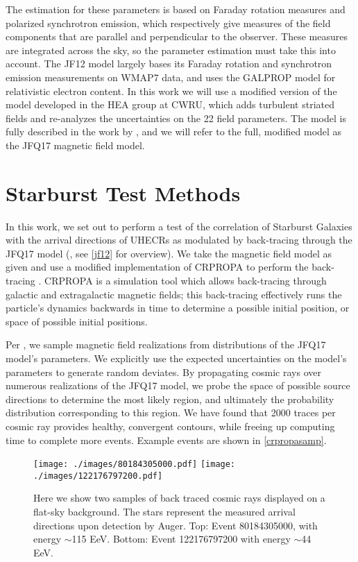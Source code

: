 The estimation for these parameters is based on Faraday rotation measures and polarized synchrotron emission, which respectively give measures of the field components that are parallel and perpendicular to the observer. These measures are integrated across the sky, so the parameter estimation must take this into account. The JF12 model largely bases its Faraday rotation and synchrotron emission measurements on WMAP7 data, and uses the GALPROP model for relativistic electron content. In this work we will use a modified version of the model developed in the HEA group at CWRU, which adds turbulent striated fields and re-analyzes the uncertainties on the 22 field parameters. The model is fully described in the work by , and we will refer to the full, modified model as the JFQ17 magnetic field model.


\section{Starburst Test Methods}%
\label{stest}
In this work, we set out to perform a test of the correlation of Starburst Galaxies with the arrival directions of UHECRs as modulated by back-tracing through the JFQ17 model (\cite{jf12,sean}, see \autoref{jf12} for overview). We take the magnetic field model as given and use a modified implementation of CRPROPA to perform the back-tracing \cite{crpropa}. CRPROPA is a simulation tool which allows back-tracing through galactic and extragalactic magnetic fields; this back-tracing effectively runs the particle's dynamics backwards in time to determine a possible initial position, or space of possible initial positions. 

Per , we sample magnetic field realizations from distributions of the JFQ17 model's parameters. We explicitly use the expected uncertainties on the model's parameters to generate random deviates. By propagating cosmic rays over numerous realizations of the JFQ17 model, we probe the space of possible source directions to determine the most likely region, and ultimately the probability distribution corresponding to this region. We have found that 2000 traces per cosmic ray provides healthy, convergent contours, while freeing up computing time to complete more events. Example events are shown in \autoref{crpropasamp}.

\begin{figure}[H]
\centering
\texttt{[image: ./images/80184305000.pdf]}
\texttt{[image: ./images/122176797200.pdf]}
\caption[CRPROPA+JF12+Quinn Modifications Samples]{Here we show two samples of back traced cosmic rays displayed on a flat-sky background. The stars represent the measured arrival directions upon detection by Auger. Top: Event 80184305000, with energy $\sim$115 EeV. Bottom: Event 122176797200 with energy $\sim$44 EeV.}
\label{crpropasamp}
\end{figure}


